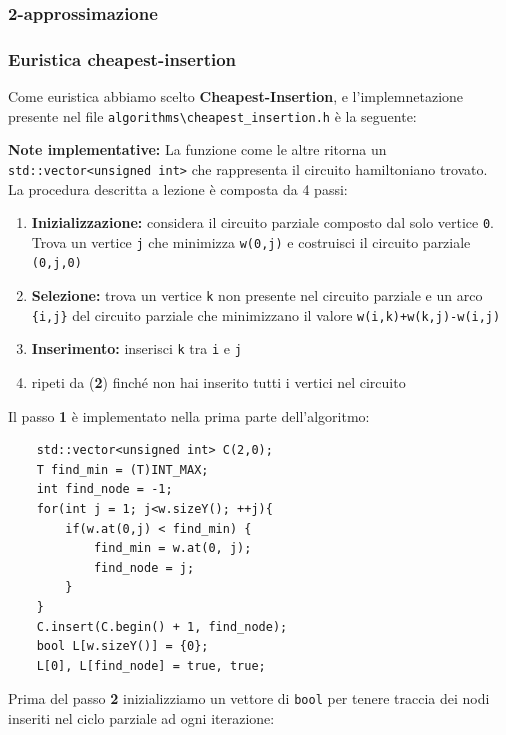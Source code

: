 \documentclass[]{article}
\begin{document}
\newpage
\subsubsection{2-approssimazione}

\newpage
\subsubsection{Euristica cheapest-insertion}
\begin{flushleft}
Come euristica abbiamo scelto \textbf{Cheapest-Insertion}, e l'implemnetazione presente nel file \verb|algorithms\cheapest_insertion.h| è la seguente:
\lstset{language=c++, style=mystyle}


\textbf{Note implementative:}
La funzione come le altre ritorna un \verb|std::vector<unsigned int>| che rappresenta il circuito hamiltoniano trovato.\\
La procedura descritta a lezione è composta da 4 passi:
\begin{enumerate}
\item \textbf{Inizializzazione:} considera il circuito parziale composto dal solo vertice \verb|0|. Trova un vertice \verb|j| che minimizza \verb|w(0,j)| e costruisci il circuito parziale \verb|(0,j,0)|
\item \textbf{Selezione:} trova un vertice \verb|k| non presente nel circuito parziale e un arco \verb|{i,j}| del circuito parziale che minimizzano il valore \verb|w(i,k)+w(k,j)-w(i,j)|
\item \textbf{Inserimento:} inserisci \verb|k| tra \verb|i| e \verb|j|
\item ripeti da (\textbf{2}) finché non hai inserito tutti i vertici nel circuito
\end{enumerate}
Il passo \textbf{1} è implementato nella prima parte dell'algoritmo:
\lstset{language=c++, style=mystyle, firstnumber=2}
\begin{lstlisting}
    std::vector<unsigned int> C(2,0);
    T find_min = (T)INT_MAX;
    int find_node = -1;
    for(int j = 1; j<w.sizeY(); ++j){
        if(w.at(0,j) < find_min) {
            find_min = w.at(0, j);
            find_node = j;
        }
    }
    C.insert(C.begin() + 1, find_node);
    bool L[w.sizeY()] = {0};
    L[0], L[find_node] = true, true;
\end{lstlisting}
Prima del passo \textbf{2} inizializziamo un vettore di \verb|bool| per tenere traccia dei nodi inseriti nel ciclo parziale ad ogni iterazione:
\lstset{language=c++, style=mystyle, firstnumber=12}

\end{flushleft}
\end{document}
